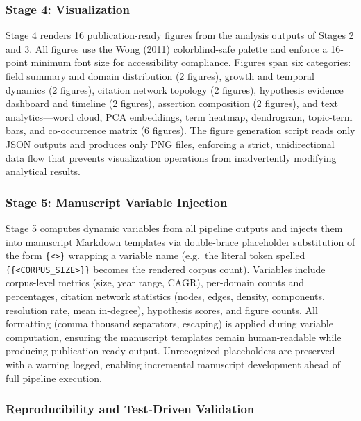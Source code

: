 \documentclass[
  english,
]{article}
\begin{document}
\subsubsection{Stage 4: Visualization}\label{stage-4-visualization}

Stage 4 renders 16 publication-ready figures from the analysis outputs
of Stages 2 and 3. All figures use the Wong (2011) colorblind-safe
palette \citep{wong2011colorblind} and enforce a 16-point minimum font
size for accessibility compliance. Figures span six categories: field
summary and domain distribution (2 figures), growth and temporal
dynamics (2 figures), citation network topology (2 figures), hypothesis
evidence dashboard and timeline (2 figures), assertion composition (2
figures), and text analytics---word cloud, PCA embeddings, term heatmap,
dendrogram, topic-term bars, and co-occurrence matrix (6 figures). The
figure generation script reads only JSON outputs and produces only PNG
files, enforcing a strict, unidirectional data flow that prevents
visualization operations from inadvertently modifying analytical
results.

\subsubsection{Stage 5: Manuscript Variable
Injection}\label{stage-5-manuscript-variable-injection}

Stage 5 computes dynamic variables from all pipeline outputs and injects
them into manuscript Markdown templates via double-brace placeholder
substitution of the form \texttt{\{\textless{}\textgreater{}\}} wrapping
a variable name (e.g.~the literal token spelled
\texttt{\{\{\textless{}CORPUS\_SIZE\textgreater{}\}\}} becomes the
rendered corpus count). Variables include corpus-level metrics (size,
year range, CAGR), per-domain counts and percentages, citation network
statistics (nodes, edges, density, components, resolution rate, mean
in-degree), hypothesis scores, and figure counts. All formatting (comma
thousand separators, escaping) is applied during variable computation,
ensuring the manuscript templates remain human-readable while producing
publication-ready output. Unrecognized placeholders are preserved with a
warning logged, enabling incremental manuscript development ahead of
full pipeline execution.

\subsubsection{Reproducibility and Test-Driven
Validation}\label{reproducibility-and-test-driven-validation}
\end{document}
